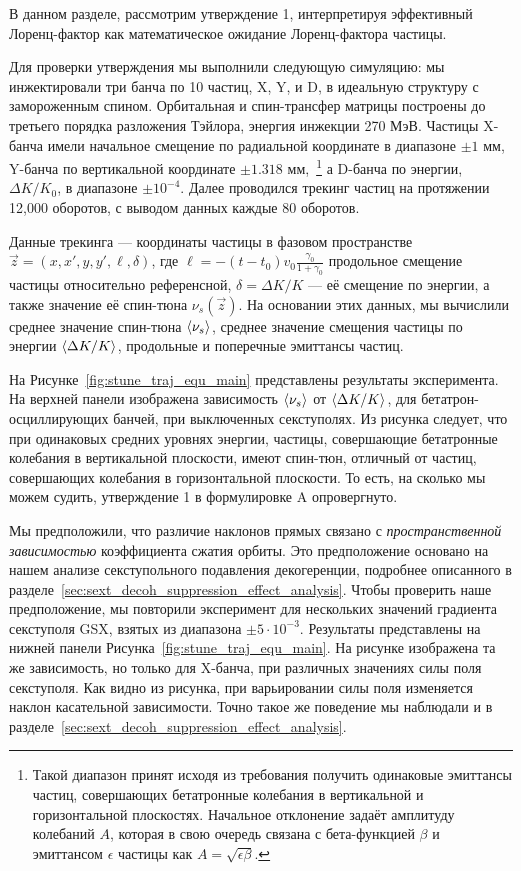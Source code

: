 
В данном разделе, рассмотрим утверждение 1, интерпретируя эффективный Лоренц-фактор как математическое ожидание Лоренц-фактора частицы.

Для проверки утверждения мы выполнили следующую симуляцию: мы инжектировали три банча по 10 частиц, X, Y, и D, в идеальную структуру с замороженным спином. Орбитальная и спин-трансфер матрицы построены до третьего порядка разложения Тэйлора, энергия инжекции 270 МэВ. Частицы X-банча имели начальное смещение по радиальной координате в диапазоне $\pm 1$ мм, Y-банча по вертикальной координате $\pm 1.318$ мм,~\footnote{Такой диапазон принят исходя из требования получить одинаковые эмиттансы частиц, совершающих бетатронные колебания в вертикальной и горизонтальной плоскостях. Начальное отклонение задаёт амплитуду колебаний $A$, которая в свою очередь связана с бета-функцией  $\beta$ и эмиттансом $\epsilon$ частицы как $A = \sqrt{\epsilon \beta}$. } а D-банча по энергии,  $\Delta K/K_0$, в диапазоне $\pm 10^{-4}$. Далее проводился трекинг частиц на протяжении 12,000 оборотов, с выводом данных каждые 80 оборотов. 

Данные трекинга --- координаты частицы в фазовом пространстве $\vec z = (x,x',y,y',\ell, \delta)$, где $\ell = -(t-t_0)v_0\frac{\gamma_0}{1+\gamma_0}$ продольное смещение частицы относительно референсной, $\delta = \Delta K/K$ --- её смещение по энергии, а также значение её спин-тюна $\nu_s(\vec z)$. На основании этих данных, мы вычислили среднее значение спин-тюна $\avg{\nu_s}$, среднее значение смещения частицы по энергии $\avg{\Delta K/K}$, продольные и поперечные эмиттансы частиц.

На Рисунке~\ref{fig:stune_traj_equ_main} представлены результаты эксперимента. На верхней панели изображена зависимость $\avg{\nu_s}$ от $\avg{\Delta K/K}$, для бетатрон-осциллирующих банчей, при выключенных секступолях. Из рисунка следует, что при одинаковых средних уровнях энергии, частицы, совершающие бетатронные колебания в вертикальной плоскости, имеют спин-тюн, отличный от частиц, совершающих колебания в горизонтальной плоскости. То есть, на сколько мы можем судить, утверждение 1 в формулировке A опровергнуто.

Мы предположили, что различие наклонов прямых связано с \emph{пространственной зависимостью} коэффициента сжатия орбиты. Это предположение основано на нашем анализе секступольного подавления декогеренции, подробнее описанного в разделе~\ref{sec:sext_decoh_suppression_effect_analysis}. Чтобы проверить наше предположение, мы повторили эксперимент для нескольких значений градиента секступоля GSX, взятых из диапазона $\pm 5\cdot 10^{-3}$.  Результаты представлены на  нижней панели Рисунка~\ref{fig:stune_traj_equ_main}. На рисунке изображена та же зависимость, но только для X-банча, при различных значениях силы поля секступоля. Как видно из рисунка, при варьировании силы поля изменяется наклон касательной зависимости. Точно такое же поведение мы наблюдали и в разделе~\ref{sec:sext_decoh_suppression_effect_analysis}.

